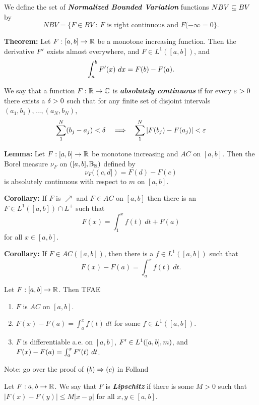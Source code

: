 \dfn We define the set of \textbf{\textit{Normalized Bounded Variation}} functions $NBV\subseteq BV$ by \[NBV = \{F\in BV\ :\ F\text{ is right continuous and }F(-\infty = 0\}.\]

\vs

\textbf{Theorem:} Let $F:[a,b] \rightarrow \mathbb{R}$ be a monotone increasing function. Then the derivative $F^\prime$ exists almost everywhere, and $F\in L^1([a,b])$, and 
\[\int_a^b F^\prime(x)\ dx = F(b) - F(a).\]

\vs

\dfn We say that a function $F:\mathbb{R}\rightarrow \mathbb{C}$ is \textbf{\textit{absolutely continuous}} if for every $\varepsilon > 0$ there exists a $\delta > 0$ such that for any finite set of disjoint intervals $(a_1,b_1),\ldots,(a_N,b_N)$,
\[\sum_1^N(b_j - a_j) < \delta\quad \Longrightarrow \quad\sum_1^N|F(b_j)- F(a_j)| < \varepsilon\]

\textbf{Lemma:} Let $F:[a,b]\rightarrow \mathbb{R}$ be monotone increasing and $AC$ on $[a,b]$. Then the Borel measure $\nu_F$ on $([a,b], \mathbb{B}_{\mathbb{R}})$ defined by 
\[\nu_F((c, d]) = F(d) - F(c)\]
is absolutely continuous with respect to $m$ on $[a,b]$.

\vs

\textbf{Corollary:} If $F$ is $\nearrow$ and $F\in AC$ on $[a,b]$ then there is an $F\in L^1([a,b]) \cap L^+$ such that 
\[F(x) = \int_1^x f(t)\ dt + F(a)\]
for all $x\in [a,b]$.

\vs

\textbf{Corollary:} If $F\in AC([a,b])$, then there is a $f\in L^1([a,b])$ such that 
\[F(x) - F(a) = \int_a^x f(t)\ dt.\]

\vs

\setcounter{thm}{34}

\begin{thm}
Let $F:[a,b] \rightarrow \mathbb{R}$. Then TFAE
\begin{enumerate}[\hspace{1em}(a)]
    \item $F$ is $AC$ on $[a,b]$.
    \item $F(x) - F(a) = \int_a^x f(t)\ dt$ for some $f\in L^1([a,b])$.
    \item $F$ is differentiable a.e. on $[a,b]$, $F^\prime \in L^1([a,b], m)$, and $F(x) - F(a) = \int_a^x F^\prime(t)\ dt$.
\end{enumerate}
\end{thm}

Note: go over the proof of $(b)\Rightarrow (c)$ in Folland


\vs


\dfn Let $F:{a,b}\rightarrow \mathbb{R}$. We say that $F$ is \textbf{\textit{Lipschitz}} if there is some $M > 0$ such that $|F(x) - F(y)| \leq M|x - y|$ for all $x,y\in [a,b]$.

